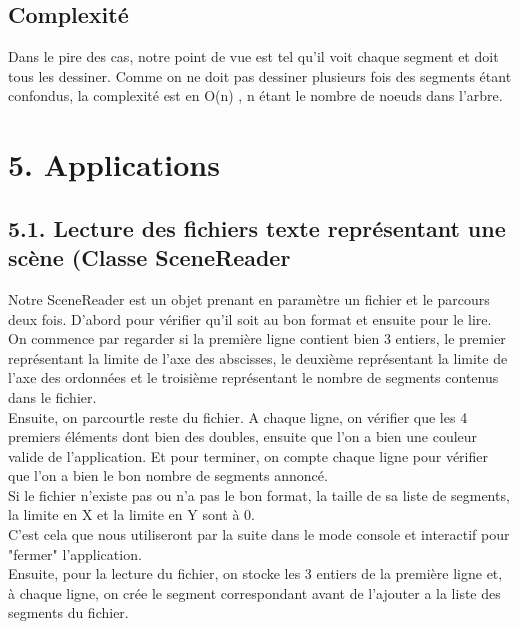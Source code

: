 \documentclass[a4paper,12pt]{report}	%
\begin{document}
    {\subsection*{Complexité}}
    Dans le pire des cas, notre point de vue est tel qu'il voit chaque segment et doit tous les dessiner. Comme on ne doit pas dessiner plusieurs fois des segments étant confondus, la complexité est en O(n) , n étant le nombre de noeuds dans l'arbre.
    
    \newpage
    
    {\section*{5. Applications}}
	
	{\subsection*{5.1. Lecture des fichiers texte représentant une scène (Classe SceneReader}}
	   Notre SceneReader est un objet prenant en paramètre un fichier et le parcours deux fois. D'abord pour vérifier qu'il soit au bon format et ensuite pour le lire.\\
\indent On commence par regarder si la première ligne contient bien 3 entiers, le premier représentant la limite de l'axe des abscisses, le deuxième représentant la limite de l'axe des ordonnées et le troisième représentant le nombre de segments contenus dans le fichier. \\
\indent Ensuite, on parcourtle reste du fichier. A chaque ligne, on vérifier que les 4 premiers éléments dont bien des doubles, ensuite que l'on a bien une couleur valide de l'application. Et pour terminer, on compte chaque ligne pour vérifier que l'on a bien le bon nombre de segments annoncé. \\
Si le fichier n'existe pas ou n'a pas le bon format, la taille de sa liste de segments, la limite en X et la limite en Y sont à 0.\\
    C'est cela que nous utiliseront par la suite dans le mode console et interactif pour "fermer" l'application. \\

    Ensuite, pour la lecture du fichier, on stocke les 3 entiers de la première ligne et, à chaque ligne, on crée le segment correspondant avant de l'ajouter a la liste des segments du fichier. \\
    
\end{document}
